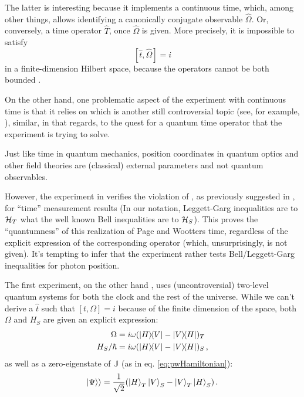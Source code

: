 The latter is interesting because it implements a continuous time,
which, among other things, allows identifying a canonically conjugate observable
$\hat{\Omega}$. Or, conversely, a time operator $\hat{T}$, once $\hat{\Omega}$ is given.
More precisely, it is impossible to satisfy
\begin{equation}\label{eq:canonical_commutation_in_time}
  [\hat{t}, \hat{\Omega}] = i
\end{equation}
in a finite-dimension Hilbert space, because the operators
cannot be both bounded \parencite{Weyl1927}.

On the other hand, one problematic aspect of the experiment with continuous time
is that
it relies on  which is another
still controversial topic (see, for example, \cite{HawtonPhotonPosition}),
similar, in that regards, to the quest for a quantum time operator that the experiment is trying to solve.

Just like time in quantum mechanics, position coordinates in quantum optics and other field theories
are (classical) external parameters and not quantum observables. 

However, the experiment in \cite{Moreva_position} verifies the violation of
, as previously suggested in \cite{LeggettGarg+PageWootters},
for ``time'' measurement results
(In our notation, Leggett-Garg inequalities are to $\mathcal{H}_T$ what the well known Bell inequalities
  are to $\mathcal{H}_S$).
This proves the ``quantumness'' of this realization of Page and Wootters time,
regardless of the explicit expression of the corresponding operator (which, unsurprisingly,
is not given). It's tempting to infer that the experiment
rather tests Bell/Leggett-Garg inequalities for photon position.

The first experiment, on the other hand \parencite{Moreva:illustration,Moreva:synthetic},
uses (uncontroversial)
two-level quantum systems for both the clock and the rest of the universe.
While we can't derive a $\hat{t}$ such that $[t, \Omega] = i$
because of the finite dimension of the space, both $\Omega$
and $H_S$ are given an explicit expression:
\begin{align}
  \Omega            &= i\omega(\ketbra{H}{V}- \ketbra{V}{H})_T \\
  H_S/{\hbar}       &= i\omega(\ketbra{H}{V}- \ketbra{V}{H})_S
  \,\text{,}
\end{align} 
as well as a zero-eigenstate of $\mathbb{J}$ (as in eq. \ref{eq:pwHamiltonian}):
\begin{equation}
  |\Psi\rangle\rangle = \frac{1}{\sqrt{2}}\qty(\ket{H}_T\ket{V}_S-\ket{V}_T\ket{H}_S)
  \,\text{.}
\end{equation}

